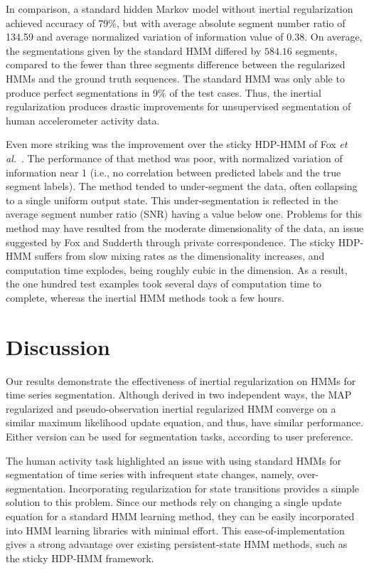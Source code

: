\documentclass[12pt]{article}
\begin{document}
In comparison, a standard hidden Markov model without inertial regularization achieved accuracy of 79\%, but with average absolute segment number ratio of 134.59 and average normalized variation of information value of $0.38$. On average, the segmentations given by the standard HMM differed by $584.16$ segments, compared to the fewer than three segments difference between the regularized HMMs and the ground truth sequences. The standard HMM was only able to produce perfect segmentations in 9\% of the test cases. Thus, the inertial regularization produces drastic improvements for unsupervised segmentation of human accelerometer activity data.

Even more striking was the improvement over the sticky HDP-HMM of Fox \emph{et al.}~\cite{fox2011sticky}. The performance of that method was poor, with normalized variation of information near 1 (i.e., no correlation between predicted labels and the true segment labels). The method tended to under-segment the data, often collapsing to a single uniform output state. This under-segmentation is reflected in the average segment number ratio (SNR) having a value below one. Problems for this method may have resulted from the moderate dimensionality of the data, an issue suggested by Fox and Sudderth through private correspondence. The sticky HDP-HMM suffers from slow mixing rates as the dimensionality increases, and computation time explodes, being roughly cubic in the dimension. As a result, the one hundred test examples took several days of computation time to complete, whereas the inertial HMM methods took a few hours. 

\section{Discussion}

Our results demonstrate the effectiveness of inertial regularization on HMMs for time series segmentation. Although derived in two independent ways, the MAP regularized and pseudo-observation inertial regularized HMM converge on a similar maximum likelihood update equation, and thus, have similar performance. Either version can be used for segmentation tasks, according to user preference. 

The human activity task highlighted an issue with using standard HMMs for segmentation of time series with infrequent state changes, namely, over-segmentation. Incorporating regularization for state transitions provides a simple solution to this problem. Since our methods rely on changing a single update equation for a standard HMM learning method, they can be easily incorporated into HMM learning libraries with minimal effort. This ease-of-implementation gives a strong advantage over existing persistent-state HMM methods, such as the sticky HDP-HMM framework.
\end{document}
